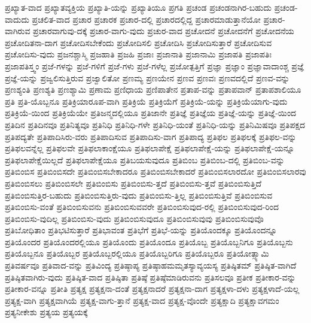 {ಪ್ರಖ್ಯಾತ-ವಾದ
ಪ್ರಖ್ಯಾತವ್ಯಕ್ತಿಯ
ಪ್ರಖ್ಯಾತಿ-ಯನ್ನು
ಪ್ರಖ್ಯಾತಿಯೂ
ಪ್ರಗತಿ
ಪ್ರಚಂಡ
ಪ್ರಚಂಡನಾಗಿರ-ಬಹುದು
ಪ್ರಚಂಡ-ವಾದುದು
ಪ್ರಚಲಿತ-ವಾದ
ಪ್ರಚಾರ
ಪ್ರಚಾರಕ
ಪ್ರಚಾರ-ದಲ್ಲಿ
ಪ್ರಚಾರದಲ್ಲಿದ್ದ
ಪ್ರಚಾರಮಾಡುತ್ತಾನೆಯೋ
ಪ್ರಚಾರ-ವಾಗಿರುವ
ಪ್ರಚಾರವಾಗುವು-ದಕ್ಕೆ
ಪ್ರಚಾರ-ವಾಗು-ವುದು
ಪ್ರಚುರ-ವಾದ
ಪ್ರಚೋದನೆ
ಪ್ರಚೋದನೆಗೆ
ಪ್ರಚೋದನೆಯ
ಪ್ರಚೋದಿತನಾ-ದಾಗ
ಪ್ರಚೋದಿಸಬೇಕೆಂದು
ಪ್ರಚೋದಿಸಲಿ
ಪ್ರಚೋದಿಸಿ
ಪ್ರಚೋದಿಸುತ್ತಾರೆ
ಪ್ರಚೋದಿಸುವ
ಪ್ರಚೋದಿಸು-ವುದು
ಪ್ರಜನಶ್ಚಾಸ್ಮಿ
ಪ್ರಜಹಾತಿ
ಪ್ರಜಹಿ
ಪ್ರಜಾಃ
ಪ್ರಜಾನಾತಿ
ಪ್ರಜಾನಾಮಿ
ಪ್ರಜಾಪತಿ
ಪ್ರಜಾಪತಿಃ
ಪ್ರಜಾಪತಿಸ್ತ್ವಂ
ಪ್ರಜೆ-ಗಳನ್ನು
ಪ್ರಜೆ-ಗಳಿಗೆ
ಪ್ರಜೆ-ಗಳು
ಪ್ರಜೆ-ಗಳೆಲ್ಲ
ಪ್ರಜೋತ್ಪತ್ತಿಗೆ
ಪ್ರಜ್ಞಾ
ಪ್ರಜ್ಞಾಂ
ಪ್ರಜ್ಞಾವಾದಾಂಶ್ಚ
ಪ್ರಜ್ಞೆ
ಪ್ರಜ್ಞೆ-ಯನ್ನು
ಪ್ರಜ್ವಲಿಸುತ್ತಿರುವ
ಪ್ರಜ್ವಾಲಿತೋ
ಪ್ರಣಮ್ಯ
ಪ್ರಣಯೇನ
ಪ್ರಣವ
ಪ್ರಣವಃ
ಪ್ರಣವದಲ್ಲಿದೆ
ಪ್ರಣವ-ವನ್ನು
ಪ್ರಣಶ್ಯಂತಿ
ಪ್ರಣಶ್ಯತಿ
ಪ್ರಣಶ್ಯಾಮಿ
ಪ್ರಣಾಮ
ಪ್ರಣಿಧಾಯ
ಪ್ರಣಿಪಾತೇನ
ಪ್ರತಾಪ-ವನ್ನು
ಪ್ರತಾಪವಾನ್
ಪ್ರತಾಪಶಾಲಿಯೂ
ಪ್ರತಿ
ಪ್ರತಿ-ಯೊಬ್ಬನೂ
ಪ್ರತಿಕ್ರಿಯಾರೂಪ-ವಾಗಿ
ಪ್ರತಿಕ್ರಿಯೆ
ಪ್ರತಿಕ್ರಿಯೆಗೆ
ಪ್ರತಿಕ್ರಿಯೆ-ಯನ್ನು
ಪ್ರತಿಕ್ರಿಯೆಯಾಗು-ವುದು
ಪ್ರತಿಕ್ರಿಯೆ-ಯಿಂದ
ಪ್ರತಿಕ್ರಿಯೆಯೇ
ಪ್ರತಿಜನ್ಮದಲ್ಲಿಯೂ
ಪ್ರತಿಜಾನೇ
ಪ್ರತಿಜ್ಞೆ
ಪ್ರತಿಜ್ಞೆಯ
ಪ್ರತಿಜ್ಞೆ-ಯನ್ನು
ಪ್ರತಿಜ್ಞೆ-ಯಿಂದ
ಪ್ರತಿದಿನ
ಪ್ರತಿದಿನವೂ
ಪ್ರತಿನಿತ್ಯವೂ
ಪ್ರತಿನಿಧಿ
ಪ್ರತಿನಿಧಿ-ಗಳೇ
ಪ್ರತಿನಿಧಿ-ಯಂತೆ
ಪ್ರತಿನಿಧಿ-ಯನ್ನು
ಪ್ರತಿನಿಮಿಷವೂ
ಪ್ರತಿಪಕ್ಷದ
ಪ್ರತಿಪದ್ಯತೇ
ಪ್ರತಿಪಾದಿಸಿರು-ವರು
ಪ್ರತಿಪಾದಿಸುವ
ಪ್ರತಿಪಾದಿಸು-ವಾಗ
ಪ್ರತಿಪಾದ್ಯ
ಪ್ರತಿಫಲ
ಪ್ರತಿಫಲಕ್ಕೆ
ಪ್ರತಿಫಲ-ವನ್ನು
ಪ್ರತಿಫಲವನ್ನೆಲ್ಲ
ಪ್ರತಿಫಲವೇ
ಪ್ರತಿಫಲಾಕಾಂಕ್ಷೆಯೂ
ಪ್ರತಿಫಲಾಪೇಕ್ಷೆ
ಪ್ರತಿಫಲಾಪೇಕ್ಷೆ-ಯನ್ನು
ಪ್ರತಿಫಲಾಪೇಕ್ಷೆ-ಯನ್ನೂ
ಪ್ರತಿಫಲಾಪೇಕ್ಷೆಯಿಲ್ಲದೆ
ಪ್ರತಿಫಲಾಪೇಕ್ಷೆಯೂ
ಪ್ರತಿಬಯಸುವುದೂ
ಪ್ರತಿಬಿಂಬ
ಪ್ರತಿಬಿಂಬ-ದಲ್ಲಿ
ಪ್ರತಿಬಿಂಬ-ವನ್ನು
ಪ್ರತಿಬಿಂಬಿಸ
ಪ್ರತಿಬಿಂಬಿಸದೇ
ಪ್ರತಿಬಿಂಬಿಸಬೇಕಾದರೂ
ಪ್ರತಿಬಿಂಬಿಸಬೇಕಾದರೆ
ಪ್ರತಿಬಿಂಬಿಸಲಾರದೋ
ಪ್ರತಿಬಿಂಬಿಸಲಾರವು
ಪ್ರತಿಬಿಂಬಿಸಲು
ಪ್ರತಿಬಿಂಬಿಸಲೇ
ಪ್ರತಿಬಿಂಬಿಸು
ಪ್ರತಿಬಿಂಬಿಸು-ತ್ತದೆ
ಪ್ರತಿಬಿಂಬಿಸು-ತ್ತವೆ
ಪ್ರತಿಬಿಂಬಿಸುತ್ತಿದೆ
ಪ್ರತಿಬಿಂಬಿಸುತ್ತಿರ-ಬಹುದು
ಪ್ರತಿಬಿಂಬಿಸುತ್ತಿರು-ವುದು
ಪ್ರತಿಬಿಂಬಿಸು-ತ್ತಿಲ್ಲ
ಪ್ರತಿಬಿಂಬಿಸುತ್ತಿವೆ
ಪ್ರತಿಬಿಂಬಿಸುವ
ಪ್ರತಿಬಿಂಬಿಸು-ವಂತೆ
ಪ್ರತಿಬಿಂಬಿಸುವನು
ಪ್ರತಿಬಿಂಬಿಸುವವರೇ
ಪ್ರತಿಬಿಂಬಿಸುವುದ-ರಲ್ಲಿ
ಪ್ರತಿಬಿಂಬಿಸುವುದ-ರಿಂದ
ಪ್ರತಿಬಿಂಬಿಸು-ವುದಿಲ್ಲ
ಪ್ರತಿಬಿಂಬಿಸು-ವುದು
ಪ್ರತಿಬಿಂಬಿಸುವುದೂ
ಪ್ರತಿಬಿಂಬಿಸುವುವು
ಪ್ರತಿಬಿಂಬಿಸುವುವೊ
ಪ್ರತಿಬೋಧಿತಾಂ
ಪ್ರತಿಭಟಿಸುತ್ತಾರೆ
ಪ್ರತಿಭಾವಂತ
ಪ್ರತಿಭೆಗೆ
ಪ್ರತಿಭೆ-ಯನ್ನು
ಪ್ರತಿಯೊಂದಕ್ಕೂ
ಪ್ರತಿಯೊಂದನ್ನೂ
ಪ್ರತಿಯೊಂದರ
ಪ್ರತಿಯೊಂದರಲ್ಲಿಯೂ
ಪ್ರತಿಯೊಂದು
ಪ್ರತಿಯೊಂದೂ
ಪ್ರತಿಯೊಬ್ಬ
ಪ್ರತಿಯೊಬ್ಬನಿಗೂ
ಪ್ರತಿಯೊಬ್ಬನು
ಪ್ರತಿಯೊಬ್ಬನೂ
ಪ್ರತಿಯೊಬ್ಬರ
ಪ್ರತಿಯೊಬ್ಬರಲ್ಲಿಯೂ
ಪ್ರತಿಯೊಬ್ಬರಿಗೂ
ಪ್ರತಿಯೊಬ್ಬರೂ
ಪ್ರತಿಯೋತ್ಸ್ಯಾಮಿ
ಪ್ರತಿವರ್ಷವೂ
ಪ್ರತಿವಾದ-ವನ್ನು
ಪ್ರತಿವಿಂದ್ಯ
ಪ್ರತಿಷ್ಠಾಪ್ಯ
ಪ್ರತಿಷ್ಠಾಹಮಮೃತಸ್ಯಾವ್ಯಯಸ್ಯ
ಪ್ರತಿಷ್ಠಿತಮ್
ಪ್ರತಿಷ್ಠಿತ-ವಾಗಿದೆ
ಪ್ರತಿಷ್ಠಿತವಾಗಿರು-ವುದು
ಪ್ರತಿಷ್ಠಿತ-ವಾದ
ಪ್ರತಿಷ್ಠಿತಾ
ಪ್ರತಿಷ್ಠೆ
ಪ್ರತಿಷ್ಠೆಮಾಡಿರುವನು
ಪ್ರತಿಸಲವೂ
ಪ್ರತೀಕ
ಪ್ರತೀಕಾರ-ವನ್ನು
ಪ್ರತೀಕಾರ-ವನ್ನೂ
ಪ್ರತೀತಿ
ಪ್ರತ್ಯಕ್ಷ
ಪ್ರತ್ಯಕ್ಷನಾ-ದಂತೆ
ಪ್ರತ್ಯಕ್ಷನಾದರೆ
ಪ್ರತ್ಯಕ್ಷನಾ-ದಾಗ
ಪ್ರತ್ಯಕ್ಷಳಾ-ದಳು
ಪ್ರತ್ಯಕ್ಷಳಾದೆ-ಯಲ್ಲ
ಪ್ರತ್ಯಕ್ಷ-ವಾಗಿ
ಪ್ರತ್ಯಕ್ಷವಾಗಿಯೆ
ಪ್ರತ್ಯಕ್ಷ-ವಾಗು-ತ್ತಾನೆ
ಪ್ರತ್ಯಕ್ಷ-ವಾದ
ಪ್ರತ್ಯಕ್ಷ-ವೊಂದೇ
ಪ್ರತ್ಯಕ್ಷಾದಿ
ಪ್ರತ್ಯಕ್ಷಾವಗಮಂ
ಪ್ರತ್ಯನೀಕೇಶು
ಪ್ರತ್ಯಯ
ಪ್ರತ್ಯಯಕ್ಕೆ
}
